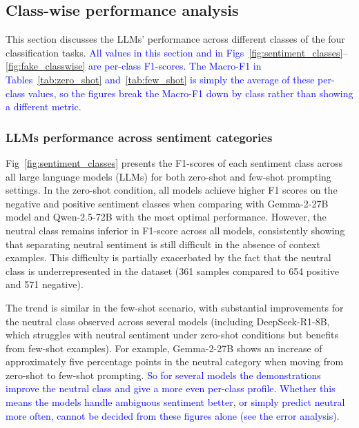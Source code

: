 \documentclass[10pt,letterpaper]{article}
\newcommand{\rev}[1]{\textcolor{blue}{#1}}
\begin{document}
\subsection*{Class-wise performance analysis}

This section discusses the LLMs' performance across different classes of the four classification tasks. \rev{All values in this section and in Figs~\ref{fig:sentiment_classes}--\ref{fig:fake_classwise} are per-class F1-scores. The Macro-F1 in Tables~\ref{tab:zero_shot} and~\ref{tab:few_shot} is simply the average of these per-class values, so the figures break the Macro-F1 down by class rather than showing a different metric.}

\subsubsection*{LLMs performance across sentiment categories}
\label{sec:sentiment_classes}

Fig~\ref{fig:sentiment_classes} presents the F1-scores of each sentiment class across all large language models (LLMs) for both zero-shot and few-shot prompting settings. In the zero-shot condition, all models achieve higher F1 scores on the negative and positive sentiment classes when comparing with Gemma-2-27B model and Qwen-2.5-72B with the most optimal performance. However, the neutral class remains inferior in F1-score across all models, consistently showing that separating neutral sentiment is still difficult in the absence of context examples. This difficulty is partially exacerbated by the fact that the neutral class is underrepresented in the dataset (361 samples compared to 654 positive and 571 negative).

The trend is similar in the few-shot scenario, with substantial improvements for the neutral class observed across several models (including DeepSeek-R1-8B, which struggles with neutral sentiment under zero-shot conditions but benefits from few-shot examples). For example, Gemma-2-27B shows an increase of approximately five percentage points in the neutral category when moving from zero-shot to few-shot prompting. \rev{So for several models the demonstrations improve the neutral class and give a more even per-class profile. Whether this means the models handle ambiguous sentiment better, or simply predict neutral more often, cannot be decided from these figures alone (see the error analysis).}
\end{document}
